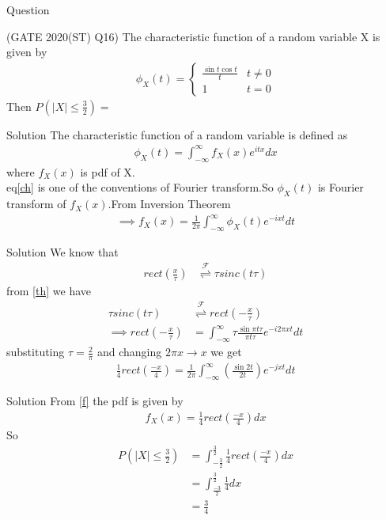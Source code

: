 \documentclass{beamer}
\providecommand{\brak}[1]{\ensuremath{\left(#1\right)}}
\providecommand{\fourier}{\overset{\mathcal{F}}{ \rightleftharpoons}}
\begin{document}
\begin{frame}{Question}
\begin{block}{(GATE 2020(ST) Q16)}
The characteristic function of a random variable X is given by
\begin{align}
\phi_{X}\brak{t}
=
\begin{cases}
\frac{\sin{t}\cos{t}}{t}           & t \neq 0 \\
1        & t = 0
\end{cases}
\end{align}
Then $ P\brak{|X|\leq \frac{3}{2}} =$ 
\end{block}    
\end{frame}
\begin{frame}{Solution}
 The characteristic function of a random variable is defined as
 \begin{align}
     \phi_{X}(t) = \int_{-\infty}^{\infty} f_{X}(x)e^{itx}dx
     \label{ch}
 \end{align}
 where $f_{X}(x)$ is pdf of X.\\
eq\eqref{ch} is one of the conventions of Fourier transform.So $\phi_{X}(t)$ is Fourier transform of $f_{X}(x)$.From Inversion Theorem
\begin{align}
    \implies f_{X}(x)=\frac{1}{2\pi} \int_{-\infty}^{\infty}  \phi_{X}\brak{t}e^{-ixt} dt 
\end{align}
\end{frame}
\begin{frame}{Solution}
   We know that 
   \begin{align}
    rect\brak{\frac{x}{\tau}} &\fourier \tau sinc(t\tau)
\end{align}
from \eqref{th} we have
\begin{align}
  \tau sinc(t\tau) &\fourier rect\brak{-\frac{x}{\tau}}\\
   \implies rect\brak{-\frac{x}{\tau}} &= \int_{-\infty}^{\infty} \tau \frac{\sin{\pi t \tau}}{{\pi t \tau}} e^{-i2\pi xt}dt
\end{align}
substituting $\tau = \frac{2}{\pi}$ and changing $2\pi x \rightarrow x $ we get
\begin{align}
    \frac{1}{4}rect\brak{\frac{-x}{4}} = \frac{1}{2\pi} \int_{-\infty}^{\infty} \brak {\frac{\sin{2t}}{2t}}e^{-jxt} dt
    \label{f}
\end{align}
\end{frame}

\begin{frame}{Solution}
From \eqref{f} the pdf is given by
  \begin{align}
    f_{X}(x) = \frac{1}{4}rect\brak{\frac{-x}{4}} dx
\end{align}
So
\begin{align}
     P\brak{|X|\leq \frac{3}{2}}&=\int_{-\frac{3}{2}}^{\frac{3}{2}} \frac{1}{4}rect\brak{\frac{-x}{4}}dx \\
      &=\int_{\frac{-3}{2}}^{\frac{3}{2}} \frac{1}{4} dx\\
    &=\frac{3}{4}
\end{align}
\end{frame}
\end{document}

